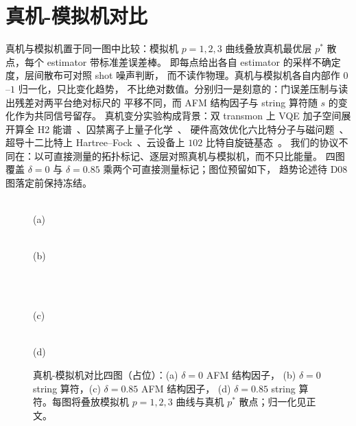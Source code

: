 \section{真机-模拟机对比}
\label{sec:comparison}

真机与模拟机置于同一图中比较：模拟机 $p=1,2,3$ 曲线叠放真机最优层 $p^*$
散点，每个 estimator 带标准差误差棒。
即每点给出各自 estimator 的采样不确定度，层间散布可对照 shot 噪声判断，
而不读作物理。真机与模拟机各自内部作 $0$--$1$ 归一化，只比变化趋势，
不比绝对数值。分别归一是刻意的：门误差压制与读出残差对两平台绝对标尺的
平移不同，而 AFM 结构因子与 string 算符随 $s$ 的变化作为共同信号留存。
真机变分实验构成背景：双 transmon 上 VQE 加子空间展开算全 H2
能谱~\cite{colless2018robust}、囚禁离子上量子化学~\cite{hempel2018quantum}、
硬件高效优化六比特分子与磁问题~\cite{kandala2017hardware}、超导十二比特上
Hartree--Fock~\cite{google2020hartree}、云设备上 $102$ 比特自旋链基态~\cite{yu2023simulating}。
我们的协议不同在：以可直接测量的拓扑标记、逐层对照真机与模拟机，而不只比能量。
四图覆盖 $\delta=0$ 与 $\delta=0.85$ 乘两个可直接测量标记；图位预留如下，
趋势论述待 D08 图落定前保持冻结。

\begin{figure}[htbp]
\centering
\begin{minipage}[b]{0.48\textwidth}
\centering
{}\\(a)
\end{minipage}
\hfill
\begin{minipage}[b]{0.48\textwidth}
\centering
{}\\(b)
\end{minipage}
\\
\begin{minipage}[b]{0.48\textwidth}
\centering
{}\\(c)
\end{minipage}
\hfill
\begin{minipage}[b]{0.48\textwidth}
\centering
{}\\(d)
\end{minipage}
\caption{真机-模拟机对比四图（占位）：(a) $\delta=0$ AFM 结构因子，
(b) $\delta=0$ string 算符，(c) $\delta=0.85$ AFM 结构因子，
(d) $\delta=0.85$ string 算符。每图将叠放模拟机 $p=1,2,3$ 曲线与真机 $p^*$
散点；归一化见正文。\label{fig:D08}}
\end{figure}
